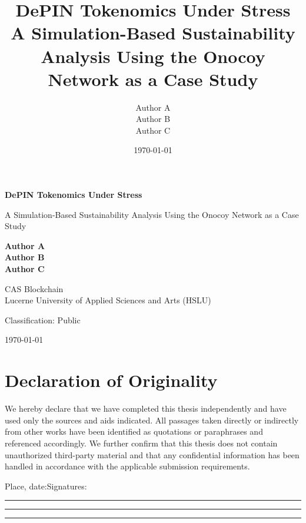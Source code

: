 \documentclass[12pt,a4paper]{article}
\title{
    \textbf{DePIN Tokenomics Under Stress} \\
    \large A Simulation-Based Sustainability Analysis Using the Onocoy Network as a Case Study
}
\author{Author A \\ Author B \\ Author C}
\date{\today}
\begin{document}
\hypersetup{pageanchor=false}
\begin{titlepage}
    \centering
    \vspace*{1cm}
    
    {\Huge \textbf{DePIN Tokenomics Under Stress}}
    
    \vspace{0.5cm}
    {\Large A Simulation-Based Sustainability Analysis Using the Onocoy Network as a Case Study}
    
    \vspace{1.5cm}
    
    \textbf{Author A} \\
    \textbf{Author B} \\
    \textbf{Author C}
    
    \vfill
    
    CAS Blockchain \\
    Lucerne University of Applied Sciences and Arts (HSLU)
    
    \vspace{0.8cm}

    Classification: Public
    
    \vspace{0.8cm}
    
    \today
    
\end{titlepage}

\thispagestyle{empty}
\section*{Declaration of Originality}
We hereby declare that we have completed this thesis independently and have used only the sources and aids indicated. All passages taken directly or indirectly from other works have been identified as quotations or paraphrases and referenced accordingly. We further confirm that this thesis does not contain unauthorized third-party material and that any confidential information has been handled in accordance with the applicable submission requirements.

\vfill

\noindent Place, date:\hfill Signatures:

\vspace{1.8cm}

\noindent\rule{0.28\textwidth}{0.4pt}\hfill\rule{0.28\textwidth}{0.4pt}\hfill\rule{0.28\textwidth}{0.4pt}
\clearpage

\end{document}
